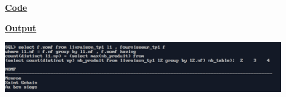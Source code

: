 \newpage
{}

\textbf{\underline{Code}}


\vspace{1cm}
\textbf{\underline{Output}}
\vspace{1cm}
\begin{center}
    \includegraphics[width=0.9\textwidth]{Questions/q39/q39.png}
\end{center}


